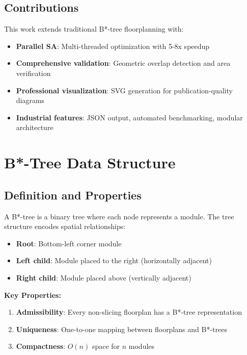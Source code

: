 \documentclass[11pt]{article}
\begin{document}
\subsection{Contributions}

This work extends traditional B*-tree floorplanning with:

\begin{itemize}
    \item \textbf{Parallel SA}: Multi-threaded optimization with 5-8x speedup
    \item \textbf{Comprehensive validation}: Geometric overlap detection and area verification
    \item \textbf{Professional visualization}: SVG generation for publication-quality diagrams
    \item \textbf{Industrial features}: JSON output, automated benchmarking, modular architecture
\end{itemize}

\section{B*-Tree Data Structure}

\subsection{Definition and Properties}

A B*-tree is a binary tree where each node represents a module. The tree structure encodes spatial relationships:

\begin{itemize}
    \item \textbf{Root}: Bottom-left corner module
    \item \textbf{Left child}: Module placed to the right (horizontally adjacent)
    \item \textbf{Right child}: Module placed above (vertically adjacent)
\end{itemize}

\textbf{Key Properties:}
\begin{enumerate}
    \item \textbf{Admissibility}: Every non-slicing floorplan has a B*-tree representation
    \item \textbf{Uniqueness}: One-to-one mapping between floorplans and B*-trees
    \item \textbf{Compactness}: $O(n)$ space for $n$ modules
\end{enumerate}
\end{document}
